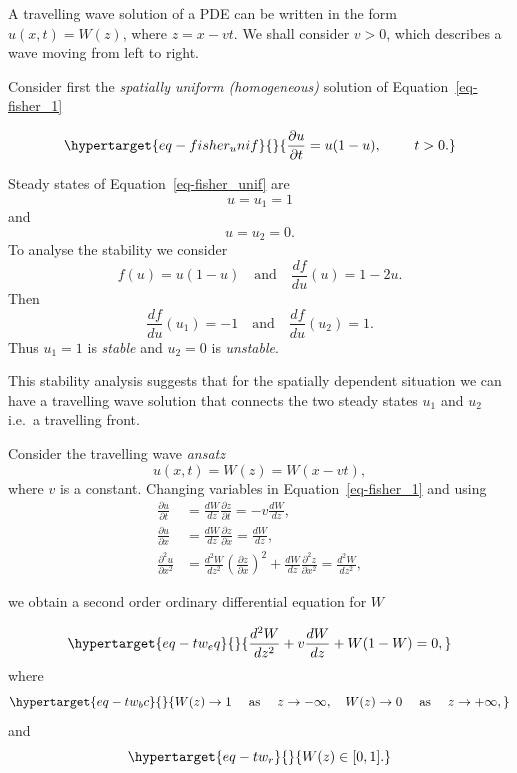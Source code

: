\documentclass[
  letterpaper,
  DIV=11,
  numbers=noendperiod]{scrreprt}
\theoremstyle{definition}
\theoremstyle{plain}
\theoremstyle{plain}
\theoremstyle{remark}
\begin{document}
A travelling wave solution of a PDE can be written in the form
\(u(x,t) = W(z)\), where \(z = x - vt\). We shall consider \(v>0\),
which describes a wave moving from left to right.

Consider first the \emph{spatially uniform (homogeneous)} solution of
Equation~\ref{eq-fisher_1}

\begin{equation}\protect\hypertarget{eq-fisher_unif}{}{ 
\frac{\partial u}{\partial t} =    u(1-u), \qquad   \, \, t >0.
}\label{eq-fisher_unif}\end{equation}

Steady states of Equation~\ref{eq-fisher_unif} are \[
u=u_1 =1
\] and \[
u=u_2 =0.
\] To analyse the stability we consider \[
f(u)=u(1-u) \quad \textrm{and} \quad \frac{ df}{du}(u)= 1 - 2u.
\] Then \[
\frac{ df}{du}(u_1)= -1 \quad \textrm{and} \quad \frac{ df}{du}(u_2)= 1.
\] Thus \(u_1=1\) is \emph{stable} and \(u_2=0\) is \emph{unstable}.

This stability analysis suggests that for the spatially dependent
situation we can have a travelling wave solution that connects the two
steady states \(u_1\) and \(u_2\) i.e.~a travelling front.

Consider the travelling wave \emph{ansatz}\\
\[
u(x,t)= W(z) = W(x-vt),
\] where \(v\) is a constant. Changing variables in
Equation~\ref{eq-fisher_1} and using \[
\begin{aligned}
\frac{ \partial u}{\partial t} &= \frac{ dW}{dz} \frac{\partial z}{\partial t} = - v   \frac{ dW}{dz}, \\
 \frac{ \partial u}{\partial x} &= \frac{ dW}{dz} \frac{\partial z}{\partial x} =\frac{ dW}{dz}, \\
 \frac{ \partial^2 u}{\partial x^2} &= \frac{ d^2W}{dz^2} \left(\frac{\partial z}{\partial x} \right)^2 +  \frac{ dW}{dz} \frac{\partial^2 z}{\partial x^2} =\frac{ d^2W}{dz^2},
\end{aligned}
\]

we obtain a second order ordinary differential equation for \(W\)

\begin{equation}\protect\hypertarget{eq-tw_eq}{}{
\frac{ d^2W}{dz^2}+  v \frac{ dW}{dz} + W(1-W)  = 0, 
}\label{eq-tw_eq}\end{equation} where
\begin{equation}\protect\hypertarget{eq-tw_bc}{}{
W(z) \to 1 \quad \text{ as } \quad z \to  - \infty, \quad 
W(z) \to 0 \quad \text{ as } \quad z \to  +\infty,
}\label{eq-tw_bc}\end{equation} and
\begin{equation}\protect\hypertarget{eq-tw_r}{}{
W(z) \in [0,1]. 
}\label{eq-tw_r}\end{equation}
\end{document}
